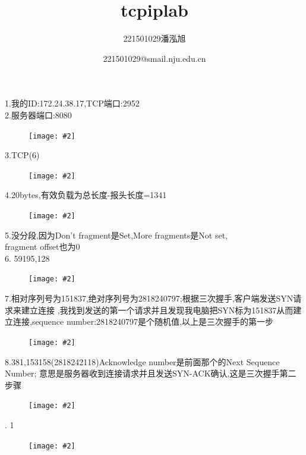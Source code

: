 \documentclass{article}
\newcommand{\displayimage}[2][width=\textwidth]{%
  \begin{figure}[htbp]
    \centering
    \texttt{[image: \#2]}
  \end{figure}
}
\begin{document}
\title{tcpiplab}
\author{221501029潘泓旭}
\date{221501029@smail.nju.edu.cn}
\maketitle
\noindent
1.我的ID:172.24.38.17,TCP端口:2952\\
2.服务器端口:8080\\
\displayimage{pic2/p1.png}

3.TCP(6)\\
\displayimage{pic2/p2.png}

4.20bytes,有效负载为总长度-报头长度=1341\\
\displayimage{pic2/p3.png}
\newpage
5.没分段,因为Don't fragment是Set,More fragments是Not set,\\fragment offset也为0\\
6.  59195,128\\
\displayimage{pic2/p5.png}

7.相对序列号为151837,绝对序列号为2818240797;根据三次握手,客户端发送SYN请求来建立连接
,我找到发送的第一个请求并且发现我电脑把SYN标为151837从而建立连接,sequence number:2818240797是个随机值,以上是三次握手的第一步\\
\displayimage{pic2/p6.png}

8.381,153158(2818242118)Acknowledge number是前面那个的Next Sequence Number;
意思是服务器收到连接请求并且发送SYN-ACK确认,这是三次握手第二步骤\\
\displayimage{pic2/p7.png}
.  1\\
\displayimage{pic2/p8.png}
\end{document}
